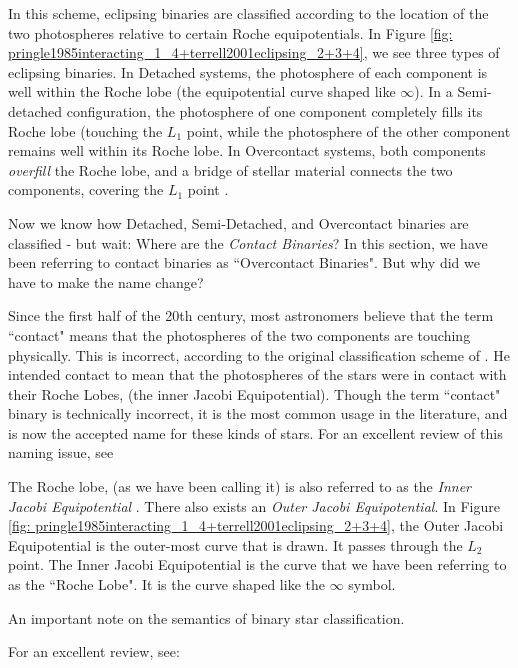 \documentclass[12pt]{article} %
\numberwithin{equation}{section} %
\begin{document}
In this scheme, eclipsing binaries are classified according to the location of the two photospheres relative to certain Roche equipotentials. In Figure \ref{fig: pringle1985interacting_1_4+terrell2001eclipsing_2+3+4}, we see three types of eclipsing binaries. In Detached systems, the photosphere of each component is well within the Roche lobe (the equipotential curve shaped like $\infty$). In a Semi-detached configuration, the photosphere of one component completely fills its Roche lobe (touching the $L_{1}$ point, while the photosphere of the other component remains well within its Roche lobe. In Overcontact systems, both components \emph{overfill} the Roche lobe, and a bridge of stellar material connects the two components, covering the $L_{1}$ point \citep{terrell2001eclipsing}.

Now we know how Detached, Semi-Detached, and Overcontact binaries are classified - but wait: Where are the \emph{Contact Binaries}? In this section, we have been referring to contact binaries as ``Overcontact Binaries". But why did we have to make the name change?

Since the first half of the 20th century, most astronomers believe that the term ``contact" means that the photospheres of the two components are touching physically. This is incorrect, according to the original classification scheme of \citet{kopal1959close}. He intended contact to mean that the photospheres of the stars were in contact with their Roche Lobes, (the inner Jacobi Equipotential). Though the term ``contact" binary is technically incorrect, it is the most common usage in the literature, and is now the accepted name for these kinds of stars. For an excellent review of this naming issue, see \citet{wilson2001binary}

The Roche lobe, (as we have been calling it) is also referred to as the \emph{Inner Jacobi Equipotential} . There also exists an \emph{Outer Jacobi Equipotential}. In Figure \ref{fig: pringle1985interacting_1_4+terrell2001eclipsing_2+3+4}, the Outer Jacobi Equipotential is the outer-most curve that is drawn. It passes through the $L_{2}$ point. The Inner Jacobi Equipotential is the curve that we have been referring to as the ``Roche Lobe". It is the curve shaped like the $\infty$ symbol.

An important note on the semantics of binary star classification. \citet{kuiper1941interpretation}

For an excellent review, see: \citep{kallrath2009eclipsing}
\end{document}
